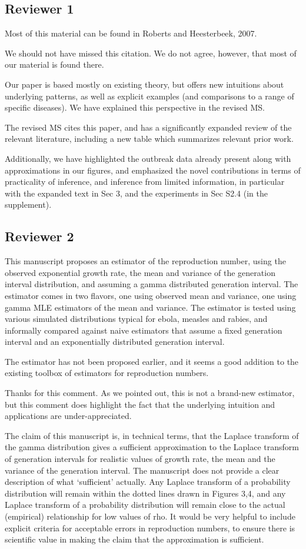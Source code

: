 \documentclass[12pt]{article}
\newcommand{\rev}{\subsection*}
\newcommand{\revtext}{\textsf}
\begin{document}
\rev{Reviewer 1}

\revtext{Most of this material can be found in Roberts and Heesterbeek, 2007.}

We should not have missed this citation. We do not agree, however, that most of our material is found there.

Our paper is based mostly on existing theory, but offers new intuitions about underlying patterns, as well as explicit examples (and comparisons to a range of specific diseases). We have explained this perspective in the revised MS.

The revised MS cites this paper, and has a significantly expanded review of the relevant literature, including a new table which summarizes relevant prior work.

Additionally, we have highlighted the outbreak data already present along with approximations in our figures, and emphasized the novel contributions in terms of practicality of inference, and inference from limited information, in particular with the expanded text in Sec 3, and the experiments in Sec S2.4 (in the supplement).

\rev{Reviewer 2}

\revtext{This manuscript proposes an estimator of the reproduction number, using the observed exponential growth rate, the mean and variance of the generation interval distribution, and assuming a gamma distributed generation interval. The estimator comes in two flavors, one using observed mean and variance, one using gamma MLE estimators of the mean and variance. The estimator is tested using various simulated distributions typical for ebola, measles and rabies, and informally compared against naive estimators that assume a fixed generation interval and an exponentially distributed generation interval.}

\revtext{The estimator has not been proposed earlier, and it seems a good addition to the existing toolbox of estimators for reproduction numbers.}

Thanks for this comment. As we pointed out, this is not a brand-new estimator, but this comment does highlight the fact that the underlying intuition and applications are under-appreciated.

\revtext{The claim of this manuscript is, in technical terms, that the Laplace transform of the gamma distribution gives a sufficient approximation to the Laplace transform of generation intervals for realistic values of growth rate, the mean and the variance of the generation interval. The manuscript does not provide a clear description of what `sufficient’ actually. Any Laplace transform of a probability distribution will remain within the dotted lines drawn in Figures 3,4, and any Laplace transform of a probability distribution will remain close to the actual (empirical) relationship for low values of rho. It would be very helpful to include explicit criteria for acceptable errors in reproduction numbers, to ensure there is scientific value in making the claim that the approximation is sufficient.}
\end{document}
